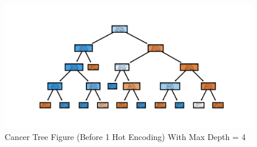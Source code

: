 \documentclass{article}
\begin{document}

\begin{figure}[H]
\centering
\includegraphics[width=8.5in]{cancer.jpg}
\caption{Cancer Tree Figure (Before 1 Hot Encoding) With Max Depth = 4 }
\label{fig_error}
\end{figure}
\end{document}
